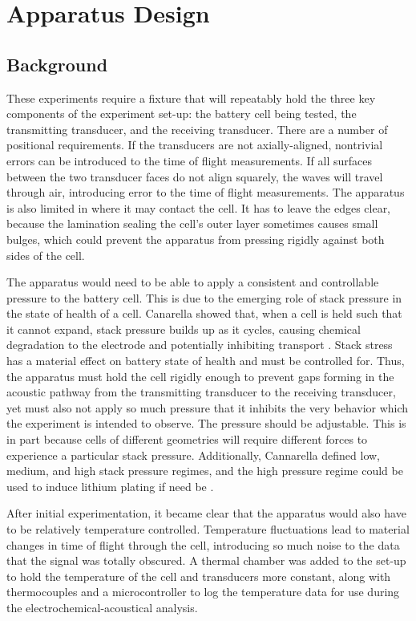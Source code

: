 \chapter{Apparatus Design}

\section{Background}
These experiments require a fixture that will repeatably hold the three key components of the experiment set-up: the battery cell being tested, the transmitting transducer, and the receiving transducer. 
There are a number of positional requirements. 
If the transducers are not axially-aligned, nontrivial errors can be introduced to the time of flight measurements.
If all surfaces between the two transducer faces do not align squarely, the waves will travel through air, introducing error to the time of flight measurements. 
The apparatus is also limited in where it may contact the cell. It has to leave the edges clear, because the lamination sealing the cell's outer layer sometimes causes small bulges, which could prevent the apparatus from pressing rigidly against both sides of the cell.

The apparatus would need to be able to apply a consistent and controllable pressure to the battery cell. 
This is due to the emerging role of stack pressure in the state of health of a cell. 
Canarella showed that, when a cell is held such that it cannot expand, stack pressure builds up as it cycles, causing chemical degradation to the electrode and potentially inhibiting transport \cite{STACK-STRESS}. Stack stress has a material effect on battery state of health and must be controlled for.
Thus, the apparatus must hold the cell rigidly enough to prevent gaps forming in the acoustic pathway from the transmitting transducer to the receiving transducer, yet must also not apply so much pressure that it inhibits the very behavior which the experiment is intended to observe. 
The pressure should be adjustable. This is in part because cells of different geometries will require different forces to experience a particular stack pressure. 
Additionally, Cannarella defined low, medium, and high stack pressure regimes, and the high pressure regime could be used to induce lithium plating if need be \cite{STACK-STRESS}.

After initial experimentation, it became clear that the apparatus would also have to be relatively temperature controlled. 
Temperature fluctuations lead to material changes in time of flight through the cell, introducing so much noise to the data that the signal was totally obscured.
A thermal chamber was added to the set-up to hold the temperature of the cell and transducers more constant, along with thermocouples and a microcontroller to log the temperature data for use during the electrochemical-acoustical analysis.

